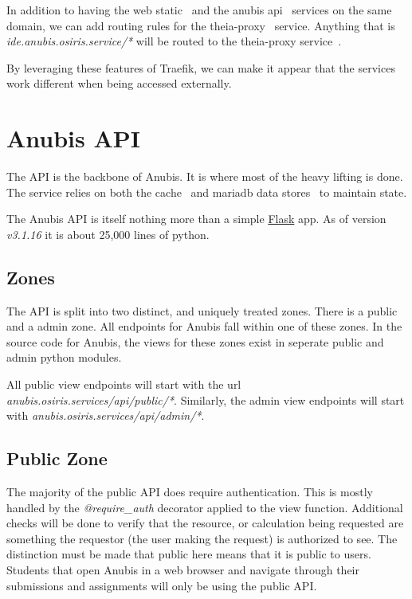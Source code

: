In addition to having the web static~ and the anubis api~ services on
the same domain, we can add routing rules for the theia-proxy~ service.
Anything that is \textit{ide.anubis.osiris.service/*} will be routed to the theia-proxy service~.

By leveraging these features of Traefik, we can make it appear that
the services work different when being accessed externally.


\section{Anubis API}\label{sec:api}

The API is the backbone of Anubis.
It is where most of the heavy lifting is done.
The service relies on both the cache~ and mariadb data
stores~ to maintain state.

The Anubis API is itself nothing more than a simple \href{https://flask.palletsprojects.com/en/2.0.x/}{Flask} app.
As of version \textit{v3.1.16} it is about 25,000 lines of python.

\subsection{Zones}\label{subsec:api-zones}

The API is split into two distinct, and uniquely treated zones.
There is a public and a admin zone.
All endpoints for Anubis fall within one of these zones.
In the source code for Anubis, the views for these zones exist
in seperate public and admin python modules.

All public view endpoints will start with the url \textit{anubis.osiris.services/api/public/*}.
Similarly, the admin view endpoints will start with \textit{anubis.osiris.services/api/admin/*}.

\subsection{Public Zone}\label{subsec:api-public-zone}
The majority of the public API does require authentication.
This is mostly handled by the \textit{@require\_auth} decorator applied to the view function.
Additional checks will be done to verify that the resource, or calculation being requested are
something the requestor (the user making the request) is authorized to see.
The distinction must be made that public here means that it is public to users.
Students that open Anubis in a web browser and navigate through their submissions and assignments
will only be using the public API.

